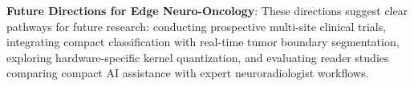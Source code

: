 \noindent\textbf{Future Directions for Edge Neuro-Oncology}: These directions suggest clear pathways for future research: conducting prospective multi-site clinical trials, integrating compact classification with real-time tumor boundary segmentation, exploring hardware-specific kernel quantization, and evaluating reader studies comparing compact AI assistance with expert neuroradiologist workflows.

